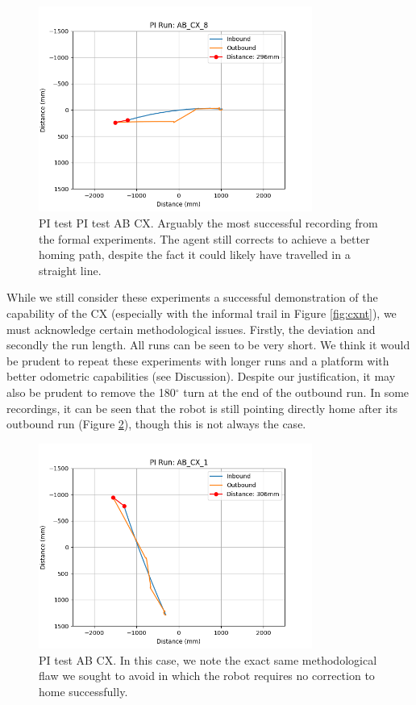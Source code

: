 \documentclass[a4paper,11pt,twoside,openright]{article}
\begin{document}
\begin{figure}[h!]
  \centering
  \includegraphics[width=0.8\textwidth]{AB_CX_8}
  \caption{\label{fig:abcx8i} PI test PI test AB\textunderscore
    CX. Arguably the most successful recording from
    the formal experiments. The agent still corrects to achieve a
    better homing path, despite the fact it could likely have
    travelled in a straight line. }
\end{figure}

While we still consider these experiments a successful demonstration
of the capability of the CX (especially with the informal trail in
Figure \ref{fig:cxnt}), we must acknowledge certain methodological
issues. Firstly, the deviation and secondly the run length. All runs
can be seen to be very short. We think it would be prudent to repeat
these experiments with longer runs and a platform with better
odometric capabilities (see Discussion). Despite our justification, it
may also be prudent to remove the 180$^{\circ}$ turn at the end of the
outbound run. In some recordings, it can be seen that the robot is
still pointing directly home after its outbound run (Figure
\ref{fig:abcx1i}), though this is not always the case.

\begin{figure}[h!]
  \centering
  \includegraphics[width=0.8\textwidth]{AB_CX_1}
  \caption{\label{fig:abcx1i} PI test AB\textunderscore
    CX. In this case, we note the exact same
    methodological flaw we sought to avoid in which the robot requires
    no correction to home successfully.}
\end{figure}
\end{document}
